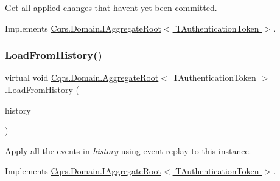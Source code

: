 Get all applied changes that haven\textquotesingle{}t yet been committed. 



Implements \hyperlink{interfaceCqrs_1_1Domain_1_1IAggregateRoot_a22fda414613f5ac0d4371554d7d6473b_a22fda414613f5ac0d4371554d7d6473b}{Cqrs.\+Domain.\+I\+Aggregate\+Root$<$ T\+Authentication\+Token $>$}.

\mbox{\label{classCqrs_1_1Domain_1_1AggregateRoot_aec873ad6e4c98309cad2d9f1c534aebb_aec873ad6e4c98309cad2d9f1c534aebb}} 
\subsubsection{\texorpdfstring{Load\+From\+History()}{LoadFromHistory()}}
{\footnotesize\ttfamily virtual void \hyperlink{classCqrs_1_1Domain_1_1AggregateRoot}{Cqrs.\+Domain.\+Aggregate\+Root}$<$ T\+Authentication\+Token $>$.Load\+From\+History (\begin{DoxyParamCaption}\item[{I\+Enumerable$<$ \hyperlink{interfaceCqrs_1_1Events_1_1IEvent}{I\+Event}$<$ T\+Authentication\+Token $>$$>$}]{history }\end{DoxyParamCaption})\hspace{0.3cm}{\ttfamily [virtual]}}



Apply all the \hyperlink{}{events} in {\itshape history}  using event replay to this instance. 



Implements \hyperlink{interfaceCqrs_1_1Domain_1_1IAggregateRoot_afe9329ee26ae68613059189ca64dfe60_afe9329ee26ae68613059189ca64dfe60}{Cqrs.\+Domain.\+I\+Aggregate\+Root$<$ T\+Authentication\+Token $>$}.

\mbox{\label{classCqrs_1_1Domain_1_1AggregateRoot_adab968b830e186cb832583910bf6f3a6_adab968b830e186cb832583910bf6f3a6}} 
